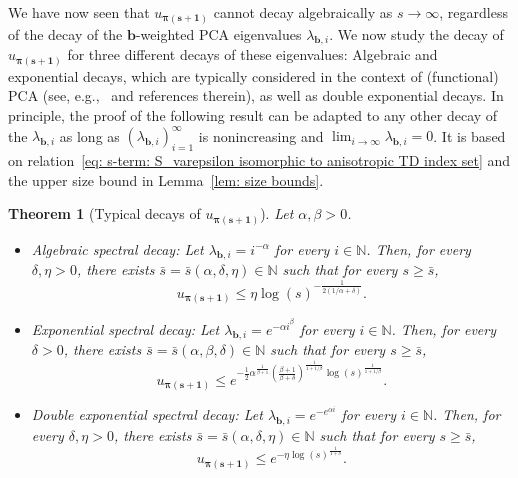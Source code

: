 \documentclass[namedate,webpdf]{ima-authoring-template-blank}
\newcounter{counter}
\numberwithin{counter}{section}
\numberwithin{equation}{section}
\theoremstyle{plain}
\newtheorem{theorem}[counter]{Theorem}
\theoremstyle{definition}
\newcommand*{\bbN}{\mathbb{N}}
\theoremstyle{thmstyletwo}
\begin{document}
We have now seen that \(u_{\bm{\pi(s + 1)}}\) cannot decay algebraically as \(s \to \infty\), regardless of the decay of the \(\bm{b}\)-weighted PCA eigenvalues \(\lambda_{\bm{b},i}\). We now study the decay of \(u_{\bm{\pi(s + 1)}}\) for three different decays of these eigenvalues: Algebraic and exponential decays, which are typically considered in the context of (functional) PCA (see, e.g.,~\citet{reiss_NonasymptoticUpperBoundsReconstruction_2020, milbradt_HighprobabilityBoundsReconstructionError_2020} and references therein), as well as double exponential decays.
In principle, the proof of the following result can be adapted to any other decay of the \(\lambda_{\bm{b},i}\) as long as \( (\lambda_{\bm{b}, i})_{i = 1}^{\infty} \) is nonincreasing and \( \lim_{i \to \infty} \lambda_{\bm{b}, i} = 0 \). It is based on relation~\eqref{eq: s-term: S_varepsilon isomorphic to anisotropic TD index set} and the upper size bound in Lemma~\ref{lem: size bounds}.

\begin{theorem}[Typical decays of \(u_{\bm{\pi(s + 1)}}\)]
\label{thm: s-term: upper bounds for u_pi(s+1)}
Let \(\alpha, \beta > 0\).
\begin{itemize}  
    \item [(a)] \emph{Algebraic spectral decay:} Let \(\lambda_{\bm{b}, i} = i^{-\alpha}\) for every \(i \in \bbN\). Then, for every \(\delta, \eta > 0\), there exists \(\bar{s} = \bar{s}(\alpha, \delta, \eta) \in \bbN\) such that for every \(s \geq \bar{s}\),
    \begin{equation}
    \label{eq: s-term: upper bound: algebraic}
        u_{\bm{\pi(s + 1)}} \leq \eta \log(s)^{-\frac{1}{2(1/\alpha + \delta)}}.
    \end{equation}

    \item [(b)] \emph{Exponential spectral decay:} Let \(\lambda_{\bm{b}, i} = e^{-\alpha i^{\beta}}\) for every \(i \in \bbN\). Then, for every \(\delta > 0\), there exists \(\bar{s} = \bar{s}(\alpha, \beta, \delta) \in \bbN\) such that for every \(s \geq \bar{s}\),
    \begin{equation}
    \label{eq: s-term: upper bound: exponential}
        u_{\bm{\pi(s + 1)}} \leq e^{- \frac{1}{2} \alpha^{\frac{1}{\beta + 1}} \left( \frac{\beta + 1}{\beta + \delta}  \right)^{\frac{1}{1 + 1/\beta}} \log(s)^{\frac{1}{1 + 1/\beta}}}.
    \end{equation}
    
    \item [(c)] \emph{Double exponential spectral decay:} Let \(\lambda_{\bm{b}, i} = e^{-e^{\alpha i}}\) for every \(i \in \bbN\). Then, for every \(\delta, \eta > 0\), there exists \(\bar{s} = \bar{s}(\alpha, \delta, \eta) \in \bbN\) such that for every \(s \geq \bar{s}\),
    \begin{equation}
    \label{eq: s-term: upper bound: double exponential}
        u_{\bm{\pi(s + 1)}} \leq e^{- \eta \log(s)^{\frac{1}{1 + \delta}}}.
    \end{equation}
\end{itemize}
\end{theorem}
\end{document}
